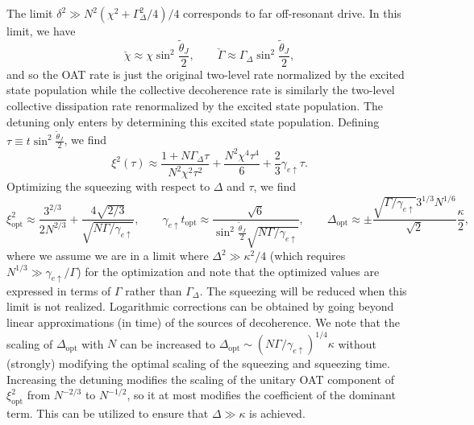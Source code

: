 \documentclass[11pt]{article}
\begin{document}
The limit $\delta^2 \gg N^2 (\chi^2 + \Gamma_\Delta^2/4)/4$ corresponds to far off-resonant drive. In this limit, we have
\begin{equation}
    \check{\chi} \approx \chi \sin^2 \frac{\tilde{\theta}_J}{2}, \qquad \check{\Gamma} \approx \Gamma_\Delta \sin^2 \frac{\tilde{\theta}_J}{2},
\end{equation}
and so the OAT rate is just the original two-level rate normalized by the excited state population while the collective decoherence rate is similarly the two-level collective dissipation rate renormalized by the excited state population. The detuning only enters by determining this excited state population. Defining $\tau \equiv t \sin^2 \frac{\tilde{\theta}_J}{2}$, we find
\begin{equation}
    \xi^2(\tau) \approx \frac{1 + N \Gamma_\Delta \tau}{N^2 \chi^2 \tau^2} + \frac{N^2 \chi^4 \tau^4}{6} + \frac{2}{3} \gamma_{e \uparrow} \tau.
\end{equation}
Optimizing the squeezing with respect to $\Delta$ and $\tau$, we find
\begin{equation}
    \xi^2_{\text{opt}} \approx \frac{3^{2/3}}{2 N^{2/3}} + \frac{4 \sqrt{2/3}}{\sqrt{N \Gamma/\gamma_{e \uparrow}}} , \qquad \gamma_{e \uparrow} t_{\text{opt}} \approx \frac{\sqrt{6}}{ \sin^2 \frac{\tilde{\theta}_J}{2}  \sqrt{ N \Gamma /\gamma_{e \uparrow}}}, \qquad \Delta_{ \text{opt}} \approx \pm \frac{\sqrt{\Gamma/\gamma_{e \uparrow}} 3^{1/3}N^{1/6}}{ \sqrt{2}} \frac{\kappa}{2},
\end{equation}
where we assume we are in a limit where $\Delta^2 \gg \kappa^2/4$ (which requires $ N^{1/3} \gg \gamma_{e \uparrow}/\Gamma$) for the optimization and note that the optimized values are expressed in terms of $\Gamma$ rather than $\Gamma_\Delta$. The squeezing will be reduced when this limit is not realized.
Logarithmic corrections can be obtained by going beyond linear approximations (in time) of the sources of decoherence. We note that the scaling of $\Delta_{\text{opt}}$ with $N$ can be increased to $\Delta_{\text{opt}} \sim (N \Gamma/\gamma_{e \uparrow})^{1/4} \kappa$ without (strongly) modifying the optimal scaling of the squeezing and squeezing time. Increasing the detuning modifies the scaling of the unitary OAT component of $\xi^2_{\text{opt}}$ from $N^{-2/3}$ to $N^{-1/2}$, so it at most modifies the coefficient of the dominant term. This can be utilized to ensure that $\Delta \gg \kappa$ is achieved.
\end{document}
